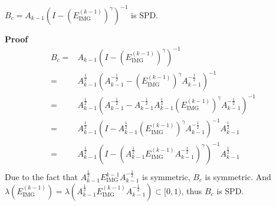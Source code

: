 \documentclass{article}
\begin{document}
\section{}
$B_c=A_{k-1}(I-(E_\text{IMG}^{(k-1)})^\gamma)^{-1}$ is SPD.

\textbf{Proof}
\begin{equation*}
    \begin{aligned}
        B_c= & A_{k-1}(I-(E_\text{IMG}^{(k-1)})^\gamma)^{-1}                                                                                                      \\
        =    & A_{k-1}^{\frac{1}{2}}(A_{k-1}^{-\frac{1}{2}}-(E_\text{IMG}^{(k-1)})^\gamma A_{k-1}^{-\frac{1}{2}})^{-1}                                            \\
        =    & A_{k-1}^{\frac{1}{2}}(A_{k-1}^{-\frac{1}{2}}-A_{k-1}^{-\frac{1}{2}}A_{k-1}^{\frac{1}{2}}(E_\text{IMG}^{(k-1)})^\gamma A_{k-1}^{-\frac{1}{2}})^{-1} \\
        =    & A_{k-1}^{\frac{1}{2}}(I-A_{k-1}^{\frac{1}{2}}(E_\text{IMG}^{(k-1)})^\gamma A_{k-1}^{-\frac{1}{2}})^{-1} A_{k-1}^{\frac{1}{2}}                      \\
        =    & A_{k-1}^{\frac{1}{2}}(I-(A_{k-1}^{\frac{1}{2}} E_\text{IMG}^{(k-1)} A_{k-1}^{-\frac{1}{2}})^\gamma)^{-1} A_{k-1}^{\frac{1}{2}}                     \\
    \end{aligned}
\end{equation*}
Due to the fact that $A_{k-1}^{\frac{1}{2}} E_\text{IMG}^{k-1} A_{k-1}^{-\frac{1}{2}}$ is symmetric, $B_c$ is symmetric. And $\lambda(E_\text{IMG}^{(k-1)})=\lambda(A_{k-1}^{\frac{1}{2}} E_\text{IMG}^{(k-1)} A_{k-1}^{-\frac{1}{2}})\subset[0,1)$, thus $B_c$ is SPD.
\end{document}
